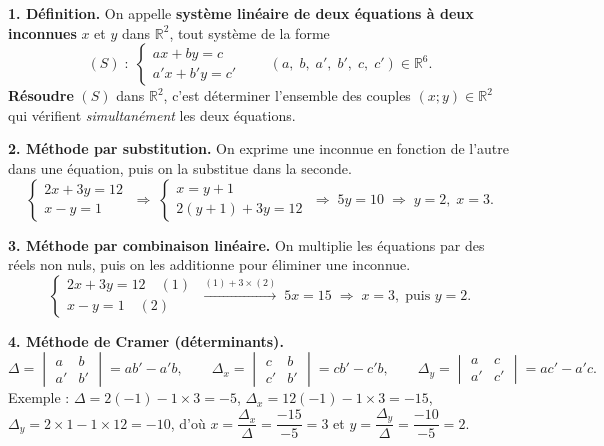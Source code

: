 \documentclass[a4paper,11pt]{article}
\begin{document}
\begin{tcolorbox}[breakable, enhanced, colback=trac!4, colframe=trac, boxrule=0.9pt,
                  arc=2pt, left=7pt, right=7pt, top=5pt, bottom=5pt,
                  title={\textbf{TRACE ÉCRITE --- Séance 1 : systèmes linéaires dans $\mathbb{R}^2$}},
                  colbacktitle=trac, coltitle=white, fonttitle=\bfseries]

\textbf{1. Définition.}
On appelle \textbf{système linéaire de deux équations à deux inconnues} $x$ et $y$
dans $\mathbb{R}^2$, tout système de la forme
\[
(S)\;:\;\begin{cases}
ax+by=c\\[2pt]
a'x+b'y=c'
\end{cases}
\qquad (a,\;b,\;a',\;b',\;c,\;c')\in\mathbb{R}^6 .
\]
\textbf{Résoudre} $(S)$ dans $\mathbb{R}^2$, c'est déterminer l'ensemble des couples
$(x;y)\in\mathbb{R}^2$ qui vérifient \emph{simultanément} les deux équations.

\textbf{2. Méthode par substitution.}
On exprime une inconnue en fonction de l'autre dans une équation, puis on la
substitue dans la seconde.
\[
\begin{cases}
2x+3y=12\\
x-y=1
\end{cases}
\;\Longrightarrow\;
\begin{cases}
x=y+1\\
2(y+1)+3y=12
\end{cases}
\;\Longrightarrow\;5y=10\;\Longrightarrow\;y=2,\;x=3.
\]

\textbf{3. Méthode par combinaison linéaire.}
On multiplie les équations par des réels non nuls, puis on les additionne pour
éliminer une inconnue.
\[
\begin{cases}
2x+3y=12 \quad (1)\\
x-y=1 \quad (2)
\end{cases}
\;\xrightarrow{(1)+3\times(2)}\;
5x=15\;\Longrightarrow\;x=3,\;\text{puis } y=2.
\]

\textbf{4. Méthode de Cramer (déterminants).}
\[
\Delta=\begin{vmatrix}a&b\\ a'&b'\end{vmatrix}=ab'-a'b,\qquad
\Delta_x=\begin{vmatrix}c&b\\ c'&b'\end{vmatrix}=cb'-c'b,\qquad
\Delta_y=\begin{vmatrix}a&c\\ a'&c'\end{vmatrix}=ac'-a'c .
\]
Exemple : $\Delta=2(-1)-1\times3=-5$, $\Delta_x=12(-1)-1\times3=-15$,
$\Delta_y=2\times1-1\times12=-10$, d'où
$x=\dfrac{\Delta_x}{\Delta}=\dfrac{-15}{-5}=3$ et
$y=\dfrac{\Delta_y}{\Delta}=\dfrac{-10}{-5}=2$.


\end{tcolorbox}
\end{document}
